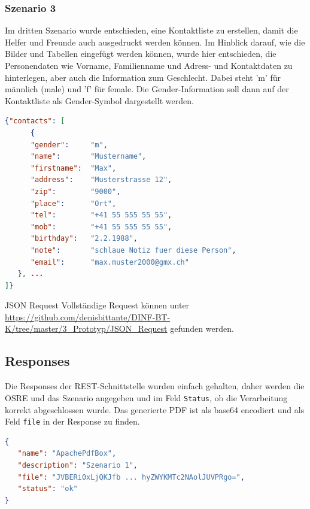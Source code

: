 \documentclass[main.tex]{subfiles}
\begin{document}
\subsubsection{Szenario 3}

Im dritten Szenario wurde entschieden, eine Kontaktliste zu erstellen, damit die Helfer und Freunde auch ausgedruckt werden können. Im Hinblick darauf, wie die Bilder und Tabellen eingefügt werden können, wurde hier entschieden, die Personendaten wie Vorname, Familienname und Adress- und Kontaktdaten zu hinterlegen, aber auch die Information zum Geschlecht. Dabei steht ’m’ für männlich (male) und ’f’ für female. Die Gender-Information soll dann auf der Kontaktliste als Gender-Symbol dargestellt werden.

\begin{lstlisting}[language=json,caption={JSON - Szenario 3},captionpos=b]
{"contacts": [
      {
      "gender":     "m",
      "name":       "Mustername",
      "firstname":  "Max",
      "address":    "Musterstrasse 12",
      "zip":        "9000",
      "place":      "Ort",
      "tel":        "+41 55 555 55 55",
      "mob":        "+41 55 555 55 55",
      "birthday":   "2.2.1988",
      "note":       "schlaue Notiz fuer diese Person",
      "email":      "max.muster2000@gmx.ch"
   }, ...
]}


\end{lstlisting}

\begin{reference}{JSON Request}
 Vollständige Request können unter \url{https://github.com/denisbittante/DINF-BT-K/tree/master/3_Prototyp/JSON_Request} gefunden werden.
\end{reference}
 


\subsection{Responses}
Die Responses der REST-Schnittstelle wurden einfach gehalten, daher werden die OSRE und das Szenario angegeben und im Feld \texttt{Status}, ob die Verarbeitung korrekt abgeschlossen wurde. Das generierte PDF ist als base64 encodiert und als Feld \texttt{file} in der Response zu finden. 
\begin{lstlisting}[language=json,caption={JSON - Antwort},captionpos=b]
{
   "name": "ApachePdfBox",
   "description": "Szenario 1",
   "file": "JVBERi0xLjQKJfb ... hyZWYKMTc2NAolJUVPRgo=",
   "status": "ok"
}

\end{lstlisting}
\end{document}

